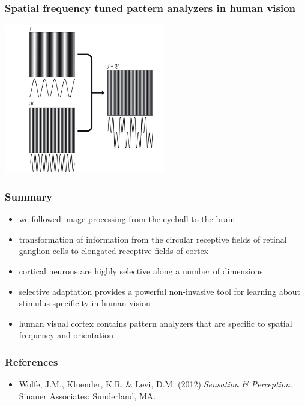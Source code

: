 \documentclass[]{beamer}
\begin{document}
\begin{frame}
 \frametitle{Spatial frequency tuned pattern analyzers in human vision}
\begin{center}
\includegraphics[width=70mm]{figs/l3/graham_nachmias.jpg}
\end{center}
\end{frame}


\begin{frame}
 \frametitle{Summary}
\begin{itemize}
\setlength{\itemsep}{5pt}
 \item we followed image processing from the eyeball to the brain
 \item transformation of information from the circular receptive fields of retinal ganglion cells to elongated receptive fields of cortex
 \item cortical neurons are highly selective along a number of dimensions
 \item selective adaptation provides a powerful non-invasive tool for learning about stimulus specificity in human vision
 \item human visual cortex contains pattern analyzers that are specific to spatial frequency and orientation
\end{itemize}
\end{frame}




\begin{frame}
 \frametitle{References}
\begin{small}
\begin{itemize}
 \item  Wolfe, J.M., Kluender, K.R. \& Levi, D.M. (2012).\textit{Sensation \& Perception}. Sinauer Associates: Sunderland, MA. 
\end{itemize}
\end{small}
\end{frame}
\end{document}
